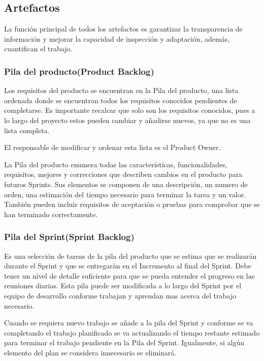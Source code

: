 \subsection{Artefactos}

La función principal de todos los artefactos es garantizar la transparencia de información y mejorar 
la capacidad de inspección y adaptación, además, cuantifican el trabajo.

\subsubsection{Pila del producto(Product Backlog)}

Los requisitos del producto se encuentran en la Pila del producto, una lista ordenada donde se encuentran 
todos los requisitos conocidos pendientes de completarse. Es importante recalcar que solo son los 
requisitos conocidos, pues a lo largo del proyecto estos pueden cambiar y añadirse nuevos, ya que no es 
una lista completa.

El responsable de modificar y ordenar esta lista es el Product Owner.

La Pila del producto enumera todas las características, funcionalidades, requisitos, mejores y correcciones 
que describen cambios en el producto para futuros Sprints. Sus elementos se componen de una descripción, 
un numero de orden, una estimación del tiempo necesario para terminar la tarea y un valor. También pueden 
incluir requisitos de aceptación o pruebas para comprobar que se han terminado correctamente.

\subsubsection{Pila del Sprint(Sprint Backlog)}

Es una selección de tareas de la pila del producto que se estima que se realizarán durante el Sprint y que se 
entregarán en el Incremento al final del Sprint. Debe tener un nivel de detalle suficiente para que se 
pueda entender el progreso en las reuniones diarias. Esta pila puede ser modificada a lo largo del Sprint 
por el equipo de desarrollo conforme trabajan y aprendan mas acerca del trabajo necesario.

Cuando se requiera nuevo trabajo se añade a la pila del Sprint y conforme se va completando el trabajo 
planificado se va actualizando el tiempo restante estimado para terminar el trabajo pendiente en la Pila 
del Sprint. Igualmente, si algún elemento del plan se considera innecesario se eliminará.

